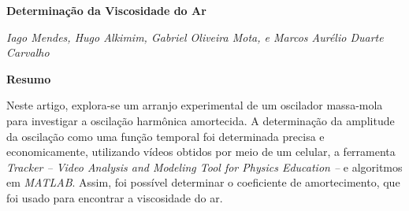 \documentclass[a4paper, 12pt]{article}
\begin{document}
	\begin{center}
	\begin{large}
		\textbf{Determinação da Viscosidade do Ar}	
	\end{large}
	\end{center}
	
	\begin{center}
		\textit{Iago Mendes, Hugo Alkimim, Gabriel Oliveira Mota, e Marcos Aurélio Duarte Carvalho}
	\end{center}

	\textbf{Resumo}
		\setlength{\parindent}{4ex}
		\par Neste artigo, explora-se um arranjo experimental de um oscilador massa-mola para investigar a oscilação harmônica amortecida. A determinação da amplitude da oscilação como uma função temporal foi determinada precisa e economicamente, utilizando vídeos obtidos por meio de um celular, a ferramenta \textit{Tracker -- Video Analysis and Modeling Tool for Physics Education --} e algoritmos em \textit{MATLAB}. Assim, foi possível determinar o coeficiente de amortecimento, que foi usado para encontrar a viscosidade do ar.
	
\end{document}
